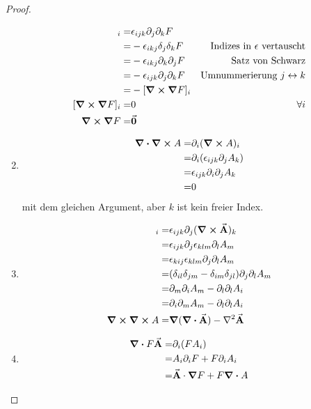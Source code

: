 \begin{proof}
\begin{parts}
\begin{enumerate}[label=(\roman*)]
\begin{align*}
				[\curl{\grad{F}}]_i=&\epsilon_{ijk}\partial_j \partial_k F\\
				=&-\epsilon_{ikj}\delta_j\delta_k F & \text{Indizes in }\epsilon\text{ vertauscht}\\
				=&-\epsilon_{ikj}\partial_k\partial_j F &\text{Satz von Schwarz}\\
				=&-\epsilon_{ijk}\partial_j\partial_k F & \text{Umnummerierung }j\leftrightarrow k\\
				=&-[\curl{\grad{F}}]_i\\
				[\curl{\grad{F}}]_i=&0&\forall i\\
				\curl{\grad{F}}=&\va 0
			\end{align*}
		\item 
			\begin{align*}
				\div{\curl{A}}=&\partial_i(\curl{A})_i\\
				=&\partial_i(\epsilon_{ijk}\partial_jA_k)\\
				=&\epsilon_{ijk}\partial_i\partial_j A_k\\
				=&0
			\end{align*}
			mit dem gleichen Argument, aber $k$ ist kein freier Index.
		\item 
			\begin{align*}
				[\curl{\curl{\va A}}]_i=& \epsilon_{ijk}\partial_j (\curl{\va A})_k\\
				=&\epsilon_{ijk}\partial_j\epsilon_{klm}\partial_l A_m\\
				=&\epsilon_{kij}\epsilon_{klm}\partial_j\partial_l A_m\\
				=&(\delta_{il}\delta_{jm}-\delta_{im}\delta_{jl})\partial_j\partial_l A_m\\
				=&\partial_m\partial_i A_m - \partial_l\partial_l A_i\\
				=& \partial_i\partial_m A_m - \partial_l \partial_l A_i\\
				\curl{\curl{A}}=&\grad{(\div{\va A})}-\laplacian{\va A}
			\end{align*}
		\item 
			\begin{align*}
				\div{F\va A}=&\partial_i(F A_i)\\
				=&A_i\partial_i F+F\partial_i A_i\\
				=&\va A\cdot\grad{F}+F\div{A}
			\end{align*}
	\end{enumerate}
	\end{parts}
\end{proof}
\begin{Problem}
	
\end{Problem}
